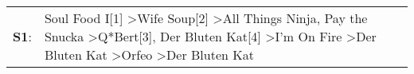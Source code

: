 \begin{supertabular}{p{0.03\textwidth}p{0.92\textwidth}}
 \textbf{S1}:  &  Soul Food I[1]\textsuperscript{} \textgreater \enspace Wife Soup[2]\textsuperscript{} \textgreater \enspace All Things Ninja\textsuperscript{}, \enspace Pay the Snucka\textsuperscript{} \textgreater \enspace Q*Bert[3]\textsuperscript{}, \enspace Der Bluten Kat[4]\textsuperscript{} \textgreater \enspace I'm On Fire\textsuperscript{} \textgreater \enspace Der Bluten Kat\textsuperscript{} \textgreater \enspace Orfeo\textsuperscript{} \textgreater \enspace Der Bluten Kat\textsuperscript{}  \enspace  \\
\end{supertabular}
